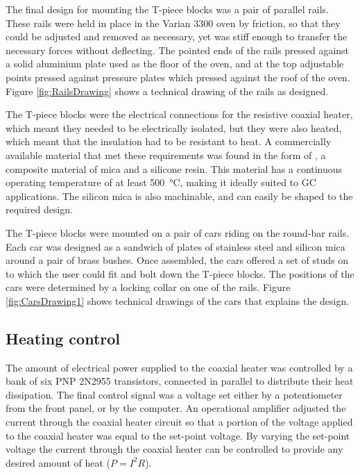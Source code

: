 The final design for mounting the T-piece blocks was a pair of parallel rails.
These rails were held in place in the Varian 3300 oven by friction, so that they
could be adjusted and removed as necessary, yet was stiff enough to transfer the
necessary forces without deflecting. The pointed ends of the rails pressed
against a solid aluminium plate used as the floor of the oven, and at the top
adjustable points pressed against pressure plates which pressed against the roof
of the oven. Figure \ref{fig:RailsDrawing} shows a technical drawing of the
rails as designed.

The T-piece blocks were the electrical connections for the resistive coaxial
heater, which meant they needed to be electrically isolated, but they were also
heated, which meant that the insulation had to be resistant to heat. A
commercially available material that met these requirements was found in the
form of , a composite material of mica and a silicone
resin. This material has a continuous operating temperature of at least
\SI{500}{\celsius}, making it ideally suited to GC applications. The silicon
mica is also machinable, and can easily be shaped to the required design. 

The T-piece blocks were mounted on a pair of cars riding on the round-bar rails.
Each car was designed as a sandwich of plates of stainless steel and silicon
mica around a pair of brass bushes. Once assembled, the cars offered a set of
studs on to which the user could fit and bolt down the T-piece blocks. The
positions of the cars were determined by a locking collar on one of the rails.
Figure \ref{fig:CarsDrawing1} shows technical drawings of the cars that explains
the design.


\subsection{Heating control}

The amount of electrical power supplied to the coaxial heater was controlled by
a bank of six PNP 2N2955 transistors, connected in parallel to distribute their
heat dissipation. The final control signal was a voltage set either by a
potentiometer from the front panel, or by the computer. An operational amplifier
adjusted the current through the coaxial heater circuit so that a portion of the
voltage applied to the coaxial heater was equal to the set-point voltage. By
varying the set-point voltage the current through the coaxial heater can be
controlled to provide any desired amount of heat (\(P = I^2R\)).

